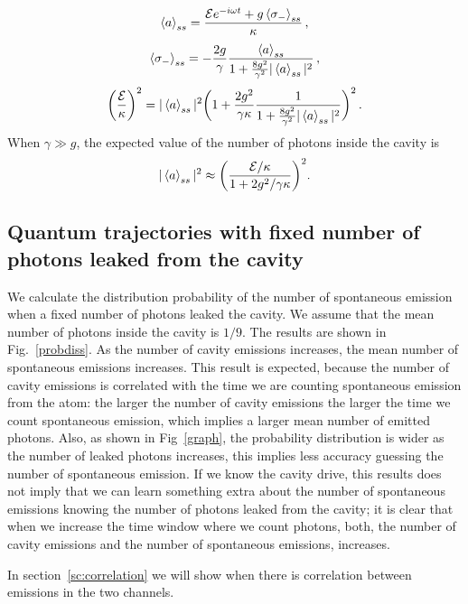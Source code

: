 \documentclass[%
 reprint,
 amsmath,amssymb,
 aps, 
]{revtex4-1}
\begin{document}
\begin{equation} \label{chaf1}
\expval{a}_{ss} = \frac{\mathcal{E}e^{-i\omega t} +
  g\expval{\sigma_-}_{ss}}{\kappa}\, ,
\end{equation}
\begin{equation} \label{chaf2}
\expval{\sigma_-}_{ss} = -\frac{2g}{\gamma}\frac{\expval{a}_{ss}}{1 +
  \frac{8g^2}{\gamma^2}|\expval{a}_{ss}|^2}\, ,
\end{equation}
\begin{equation}
\bigg(\frac{\mathcal{E}}{\kappa}\bigg)^2 = |\expval{a}_{ss}|^2 \bigg(1
+ \frac{2g^2}{\gamma \kappa}\frac{1}{1 +
  \frac{8g^2}{\gamma^2}|\expval{a}_{ss}|^2}\bigg)^2\, .
\end{equation}
When $\gamma \gg g$, the expected value of the number of photons inside
the cavity is 
\begin{equation} \label{numfo}
|\expval{a}_{ss}|^2 \approx \bigg(\frac{\mathcal{E}/\kappa}{1 + 2g^2/\gamma \kappa}\bigg)^2.
\end{equation}


\subsection{Quantum trajectories with fixed number of photons leaked from the cavity}
We calculate the distribution probability of the number of spontaneous
emission when a fixed number of photons leaked the cavity. We assume
that the mean number of photons inside the cavity is $1/9$. The
results are shown in Fig.~\ref{probdiss}. As the number of cavity
emissions increases, the mean number of spontaneous emissions
increases. This result is expected, because the number of cavity
emissions is correlated with the time we are counting spontaneous
emission from the atom: the larger the number of cavity
emissions the larger the time we count spontaneous emission,
which implies a larger mean number of emitted photons. Also, as shown
in Fig~\ref{graph}, the probability distribution is wider as the
number of leaked photons increases, this implies less accuracy
guessing the number of spontaneous emission. If we know the cavity
drive, this results does not imply that we can learn something extra
about the number of spontaneous emissions knowing the number of
photons leaked from the cavity; it is clear that when we increase the
time window where we count photons, both, the number of cavity emissions
and the number of spontaneous emissions, increases.

In section~\ref{sc:correlation} we will show
when there is correlation between emissions in the two channels.
\end{document}
